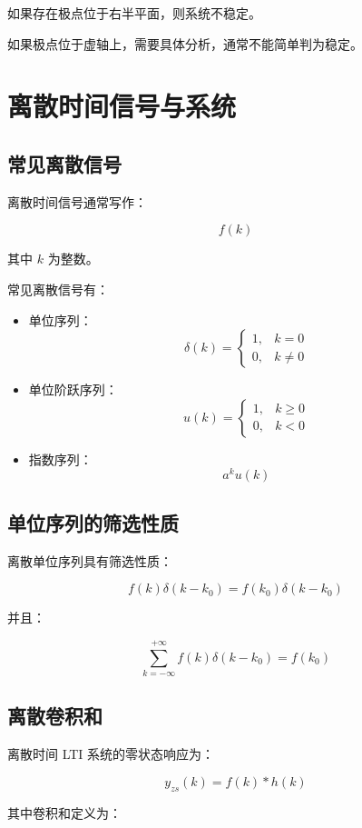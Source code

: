 \documentclass[UTF8]{ctexart}
\begin{document}
如果存在极点位于右半平面，则系统不稳定。

如果极点位于虚轴上，需要具体分析，通常不能简单判为稳定。

\section{离散时间信号与系统}

\subsection{常见离散信号}

离散时间信号通常写作：

\[
f(k)
\]

其中 $k$ 为整数。

常见离散信号有：

\begin{itemize}
    \item 单位序列：
    \[
    \delta(k)=
    \begin{cases}
    1, & k=0\\
    0, & k\neq 0
    \end{cases}
    \]
    \item 单位阶跃序列：
    \[
    u(k)=
    \begin{cases}
    1, & k\geq 0\\
    0, & k<0
    \end{cases}
    \]
    \item 指数序列：
    \[
    a^ku(k)
    \]
\end{itemize}

\subsection{单位序列的筛选性质}

离散单位序列具有筛选性质：

\[
f(k)\delta(k-k_0)=f(k_0)\delta(k-k_0)
\]

并且：

\[
\sum_{k=-\infty}^{+\infty}f(k)\delta(k-k_0)=f(k_0)
\]

\subsection{离散卷积和}

离散时间 LTI 系统的零状态响应为：

\[
y_{zs}(k)=f(k)*h(k)
\]

其中卷积和定义为：
\end{document}
